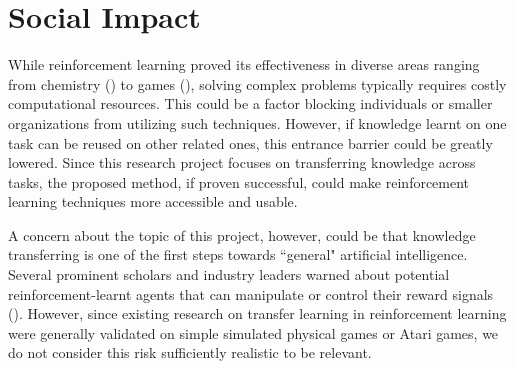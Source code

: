 \section{Social Impact}

While reinforcement learning proved its effectiveness in diverse areas ranging from chemistry (\cite{zhou2017optimizing}) to games (\cite{silver2017mastering}), solving complex problems typically requires costly computational resources. This could be a factor blocking individuals or smaller organizations from utilizing such techniques. However, if knowledge learnt on one task can be reused on other related ones, this entrance barrier could be greatly lowered. Since this research project focuses on transferring knowledge across tasks, the proposed method, if proven successful, could make reinforcement learning techniques more accessible and usable.

A concern about the topic of this project, however, could be that knowledge transferring is one of the first steps towards ``general" artificial intelligence. Several prominent scholars and industry leaders warned about potential reinforcement-learnt agents that can manipulate or control their reward signals (\cite{russell2016research}). However, since existing research on transfer learning in reinforcement learning were generally validated on simple simulated physical games or Atari games, we do not consider this risk sufficiently realistic to be relevant. 


